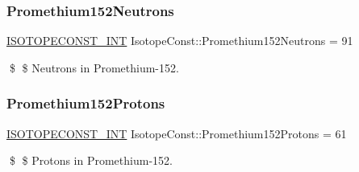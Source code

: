 \subsubsection{\texorpdfstring{Promethium152\+Neutrons}{Promethium152Neutrons}}
{\footnotesize\ttfamily \mbox{\hyperlink{group___isotope_const-_macros_ga5f18360b3e99483a35c32d789e62621c}{I\+S\+O\+T\+O\+P\+E\+C\+O\+N\+S\+T\+\_\+\+I\+NT}} Isotope\+Const\+::\+Promethium152\+Neutrons = 91}

\$ \$ Neutrons in Promethium-\/152. \mbox{\label{group___isotope_const-_promethium-_pm152_ga1587f5c91c41f50cf4bb3e69c011e04b}} 
\subsubsection{\texorpdfstring{Promethium152\+Protons}{Promethium152Protons}}
{\footnotesize\ttfamily \mbox{\hyperlink{group___isotope_const-_macros_ga5f18360b3e99483a35c32d789e62621c}{I\+S\+O\+T\+O\+P\+E\+C\+O\+N\+S\+T\+\_\+\+I\+NT}} Isotope\+Const\+::\+Promethium152\+Protons = 61}

\$ \$ Protons in Promethium-\/152. 